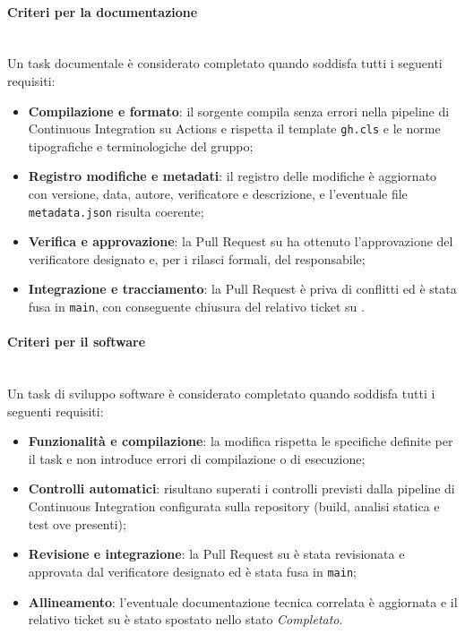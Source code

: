 \paragraph{Criteri per la documentazione}~\\[0.15cm]
Un task documentale è considerato completato quando soddisfa tutti i seguenti requisiti:
\begin{itemize}
    \item \textbf{Compilazione e formato}: il sorgente \term{\LaTeX}{} compila senza errori nella pipeline di Continuous Integration su  Actions e rispetta il template \texttt{gh.cls} e le norme tipografiche e terminologiche del gruppo;
    \item \textbf{Registro modifiche e metadati}: il registro delle modifiche è aggiornato con versione, data, autore, verificatore e descrizione, e l'eventuale file \texttt{metadata.json} risulta coerente;
    \item \textbf{Verifica e approvazione}: la Pull Request su  ha ottenuto l'approvazione del verificatore designato e, per i rilasci formali, del responsabile;
    \item \textbf{Integrazione e tracciamento}: la Pull Request è priva di conflitti ed è stata fusa in \texttt{main}, con conseguente chiusura del relativo ticket su .
\end{itemize}

\paragraph{Criteri per il software}~\\[0.15cm]
Un task di sviluppo software è considerato completato quando soddisfa tutti i seguenti requisiti:
\begin{itemize}
    \item \textbf{Funzionalità e compilazione}: la modifica rispetta le specifiche definite per il task e non introduce errori di compilazione o di esecuzione;
    \item \textbf{Controlli automatici}: risultano superati i controlli previsti dalla pipeline di Continuous Integration configurata sulla repository (build, analisi statica e test ove presenti);
    \item \textbf{Revisione e integrazione}: la Pull Request su  è stata revisionata e approvata dal verificatore designato ed è stata fusa in \texttt{main};
    \item \textbf{Allineamento}: l'eventuale documentazione tecnica correlata è aggiornata e il relativo ticket su  è stato spostato nello stato \emph{Completato}.
\end{itemize}

